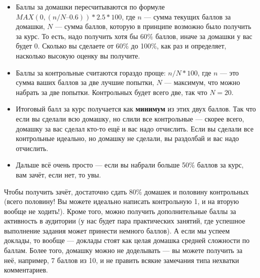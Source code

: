 \documentclass[a5paper]{article}
\begin{document}
\begin{itemize}
    \item Баллы за домашки пересчитываются по формуле $MAX(0, (n/N – 0.6)) * 2.5 * 100$, где $n$ --- сумма текущих баллов за домашки, $N$ --- сумма баллов, которую в принципе возможно было получить за курс. То есть, надо получить хотя бы 60\% баллов, иначе за домашки у вас будет 0. Сколько вы сделаете от 60\% до 100\%, как раз и определяет, насколько высокую оценку вы получите.
    \item Баллы за контрольные считаются гораздо проще: $n/N * 100$, где $n$ --- это сумма ваших баллов за две лучшие попытки, $N$ --- максимум, что можно набрать за две попытки. Контрольных будет всего две, так что $N = 20$.
    \item Итоговый балл за курс получается как \textbf{минимум} из этих двух баллов. Так что если вы сделали всю домашку, но слили все контрольные --- скорее всего, домашку за вас сделал кто-то ещё и вас надо отчислить. Если вы сделали все контрольные идеально, но домашку не сделали, вы раздолбай и вас надо отчислить.
    \item Дальше всё очень просто --- если вы набрали больше 50\% баллов за курс, вам зачёт, если нет, то увы.
\end{itemize}

Чтобы получить зачёт, достаточно сдать 80\% домашек и половину контрольных (всего половину! Вы можете идеально написать контрольную 1, и на вторую вообще не ходить!). Кроме того, можно получить дополнительные баллы за активность в аудитории (у нас будет пара практических занятий, где успешное выполнение задания может принести немного баллов). А если мы успеем доклады, то вообще --- доклады стоят как целая домашка средней сложности по баллам. Более того, домашку можно не доделывать --- вы можете получить за неё, например, 7 баллов из 10, и не править всякие замечания типа нехватки комментариев.
\end{document}
